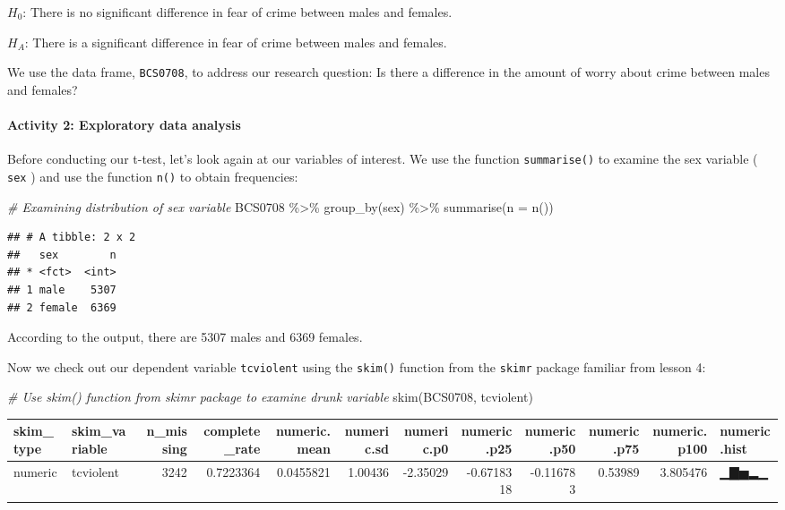 \documentclass[
]{book}
\newenvironment{Shaded}{\begin{snugshade}}{\end{snugshade}}
\newcommand{\AttributeTok}[1]{\textcolor[rgb]{0.77,0.63,0.00}{#1}}
\newcommand{\CommentTok}[1]{\textcolor[rgb]{0.56,0.35,0.01}{\textit{#1}}}
\newcommand{\FunctionTok}[1]{\textcolor[rgb]{0.00,0.00,0.00}{#1}}
\newcommand{\NormalTok}[1]{#1}
\newcommand{\SpecialCharTok}[1]{\textcolor[rgb]{0.00,0.00,0.00}{#1}}
\begin{document}
\(H_0\): There is no significant difference in fear of crime between males and females.

\(H_A\): There is a significant difference in fear of crime between males and females.

We use the data frame, \texttt{BCS0708}, to address our research question: Is there a difference in the amount of worry about crime between males and females?

\hypertarget{activity-2-exploratory-data-analysis}{%
\paragraph{Activity 2: Exploratory data analysis}\label{activity-2-exploratory-data-analysis}}

Before conducting our t-test, let's look again at our variables of interest. We use the function \texttt{summarise()} to examine the sex variable ( \texttt{sex} ) and use the function \texttt{n()} to obtain frequencies:

\begin{Shaded}
\begin{Highlighting}[]
\CommentTok{\# Examining distribution of sex variable}
\NormalTok{BCS0708 }\SpecialCharTok{\%\textgreater{}\%} \FunctionTok{group\_by}\NormalTok{(sex) }\SpecialCharTok{\%\textgreater{}\%} \FunctionTok{summarise}\NormalTok{(}\AttributeTok{n =} \FunctionTok{n}\NormalTok{())}
\end{Highlighting}
\end{Shaded}

\begin{verbatim}
## # A tibble: 2 x 2
##   sex        n
## * <fct>  <int>
## 1 male    5307
## 2 female  6369
\end{verbatim}

According to the output, there are 5307 males and 6369 females.

Now we check out our dependent variable \texttt{tcviolent} using the \texttt{skim()} function from the \texttt{skimr} package familiar from lesson 4:

\begin{Shaded}
\begin{Highlighting}[]
\CommentTok{\# Use skim() function from skimr package to examine drunk variable }
\FunctionTok{skim}\NormalTok{(BCS0708, tcviolent)}
\end{Highlighting}
\end{Shaded}

\begin{tabular}{l|l|r|r|r|r|r|r|r|r|r|l}
\hline
skim\_type & skim\_variable & n\_missing & complete\_rate & numeric.mean & numeric.sd & numeric.p0 & numeric.p25 & numeric.p50 & numeric.p75 & numeric.p100 & numeric.hist\\
\hline
numeric & tcviolent & 3242 & 0.7223364 & 0.0455821 & 1.00436 & -2.35029 & -0.6718318 & -0.116783 & 0.53989 & 3.805476 & ▁▇▅▂▁\\
\hline
\end{tabular}
\end{document}
